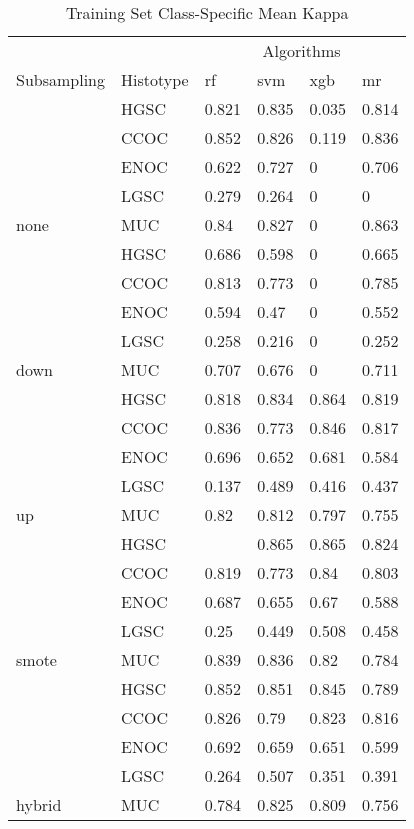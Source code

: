 \documentclass[
]{report}
\begin{document}
\begin{table}

\caption{\label{tab:train-kappa-class-table}Training Set Class-Specific Mean Kappa}
\centering
\begin{tabular}[t]{l|l|l|l|l|l}
\hline
\multicolumn{2}{c|}{ } & \multicolumn{4}{c}{Algorithms} \\
\cline{3-6}
Subsampling & Histotype & rf & svm & xgb & mr\\
\hline
 & HGSC & 0.821 & 0.835 & 0.035 & 0.814\\
\cline{2-6}
 & CCOC & 0.852 & 0.826 & 0.119 & 0.836\\
\cline{2-6}
 & ENOC & 0.622 & 0.727 & 0 & 0.706\\
\cline{2-6}
 & LGSC & 0.279 & 0.264 & 0 & 0\\
\cline{2-6}
\multirow{-5}{*}{\raggedright\arraybackslash none} & MUC & 0.84 & 0.827 & 0 & 0.863\\
\cline{1-6}
 & HGSC & 0.686 & 0.598 & 0 & 0.665\\
\cline{2-6}
 & CCOC & 0.813 & 0.773 & 0 & 0.785\\
\cline{2-6}
 & ENOC & 0.594 & 0.47 & 0 & 0.552\\
\cline{2-6}
 & LGSC & 0.258 & 0.216 & 0 & 0.252\\
\cline{2-6}
\multirow{-5}{*}{\raggedright\arraybackslash down} & MUC & 0.707 & 0.676 & 0 & 0.711\\
\cline{1-6}
 & HGSC & 0.818 & 0.834 & 0.864 & 0.819\\
\cline{2-6}
 & CCOC & 0.836 & 0.773 & 0.846 & 0.817\\
\cline{2-6}
 & ENOC & 0.696 & 0.652 & 0.681 & 0.584\\
\cline{2-6}
 & LGSC & 0.137 & 0.489 & 0.416 & 0.437\\
\cline{2-6}
\multirow{-5}{*}{\raggedright\arraybackslash up} & MUC & 0.82 & 0.812 & 0.797 & 0.755\\
\cline{1-6}
 & HGSC & \cellcolor[HTML]{90ee90}{0.875} & 0.865 & 0.865 & 0.824\\
\cline{2-6}
 & CCOC & 0.819 & 0.773 & 0.84 & 0.803\\
\cline{2-6}
 & ENOC & 0.687 & 0.655 & 0.67 & 0.588\\
\cline{2-6}
 & LGSC & 0.25 & 0.449 & 0.508 & 0.458\\
\cline{2-6}
\multirow{-5}{*}{\raggedright\arraybackslash smote} & MUC & 0.839 & 0.836 & 0.82 & 0.784\\
\cline{1-6}
 & HGSC & 0.852 & 0.851 & 0.845 & 0.789\\
\cline{2-6}
 & CCOC & 0.826 & 0.79 & 0.823 & 0.816\\
\cline{2-6}
 & ENOC & 0.692 & 0.659 & 0.651 & 0.599\\
\cline{2-6}
 & LGSC & 0.264 & 0.507 & 0.351 & 0.391\\
\cline{2-6}
\multirow{-5}{*}{\raggedright\arraybackslash hybrid} & MUC & 0.784 & 0.825 & 0.809 & 0.756\\
\hline
\end{tabular}
\end{table}
\end{document}
